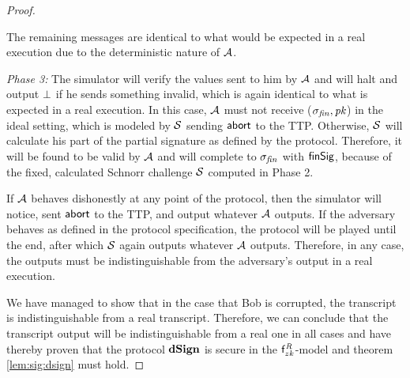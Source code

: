 \begin{proof}
\begin{asparaitem}
        The remaining messages are identical to what would be expected in a real execution due to the deterministic nature of $\mathcal{A}$.
        \item \textit{Phase 3: } The simulator will verify the values sent to him by $\mathcal{A}$ and will halt and output $\bot$ if he sends something invalid, which is again identical to what is expected in a real execution.
        In this case, $\mathcal{A}$ must not receive ($\sigma_{\mathit{fin}}, \mathit{pk}$) in the ideal setting, which is modeled by $\mathcal{S}$ sending $\mathsf{abort}$ to the TTP.
        Otherwise, $\mathcal{S}$ will calculate his part of the partial signature as defined by the protocol.
        Therefore, it will be found to be valid by $\mathcal{A}$ and will complete to $\sigma_{\mathit{fin}}$ with $\mathsf{finSig}$, because of the fixed, calculated Schnorr challenge $\mathcal{S}$ computed in Phase 2.
        \item If $\mathcal{A}$ behaves dishonestly at any point of the protocol, then the simulator will notice, sent $\mathsf{abort}$ to the TTP, and output whatever $\mathcal{A}$ outputs.
        If the adversary behaves as defined in the protocol specification, the protocol will be played until the end, after which $\mathcal{S}$ again outputs whatever $\mathcal{A}$ outputs.
        Therefore, in any case, the outputs must be indistinguishable from the adversary's output in a real execution.
    \end{asparaitem}

    We have managed to show that in the case that Bob is corrupted, the transcript is indistinguishable from a real transcript.
    Therefore, we can conclude that the transcript output will be indistinguishable from a real one in all cases and have thereby proven that the protocol $\mathbf{dSign}$ is secure in the $\mathsf{f}^{\mathit{R}}_{zk}$-model and theorem \cref{lem:sig:dsign} must hold.
\end{proof}

